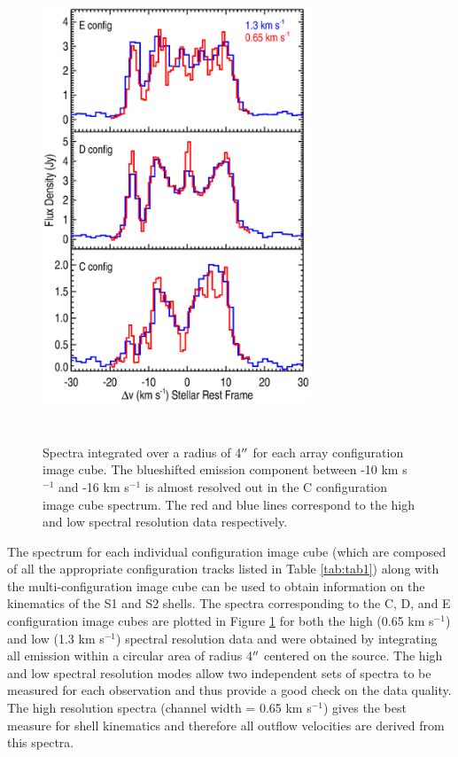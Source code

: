 \documentclass[iop]{emulateapj}
\begin{document}
\begin{figure}
\includegraphics[trim=90pt 60pt 45pt 50pt, clip, width=8.0cm, height=14.0cm]{f1.eps}
\caption{Spectra integrated over a radius of 4$\mbox{$^{\prime\prime}$}$ for each array configuration image cube. The blueshifted emission component between -10 km s${}^{-1}$ and -16 km s${}^{-1}$ is almost resolved out in the C configuration image cube spectrum. The red and blue lines correspond to the high and low spectral resolution data respectively.\label{fig1}}
\label{fig:fig1}
\end{figure}

The spectrum for each individual configuration image cube (which are composed of all the appropriate configuration tracks listed in Table \ref{tab:tab1}) along with the multi-configuration image cube can be used to obtain information on the kinematics of the S1 and S2 shells. The spectra corresponding  to the C, D, and E configuration image cubes are plotted in Figure \ref{fig:fig1} for both the high (0.65 km s${}^{-1}$) and low (1.3 km s${}^{-1}$) spectral resolution data and were obtained by integrating all emission within a circular area of radius 4$\mbox{$^{\prime\prime}$}$ centered on the source. The high and low spectral resolution modes allow two independent sets of spectra to be measured for each observation and thus provide a good check on the data quality. The high resolution  spectra (channel width = 0.65 km s${}^{-1}$)  gives the best measure for shell kinematics and therefore all outflow velocities are derived from this spectra.
\end{document}
